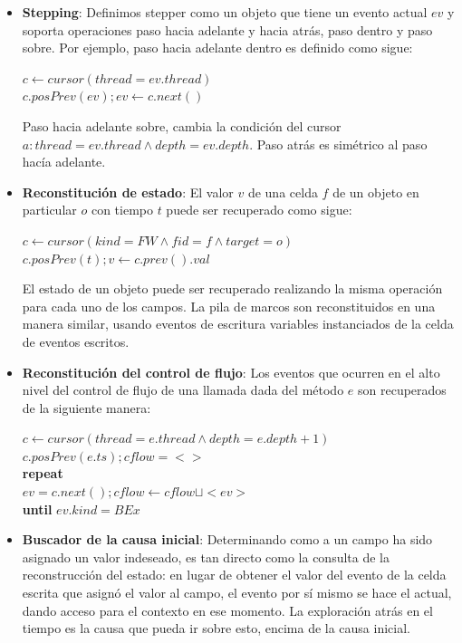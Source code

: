 \documentclass[12pt,legalpaper]{report}
\begin{document}
\begin{itemize}
	\item \textbf{Stepping}: Definimos stepper como un objeto que tiene un evento actual $ev$ y soporta operaciones paso hacia adelante y hacia atrás, paso dentro y paso sobre.  Por ejemplo, paso hacia adelante dentro es definido como sigue:

	$c \leftarrow cursor(thread = ev.thread)$\\
	$c.posPrev(ev); ev \leftarrow c.next()$

Paso hacia adelante sobre, cambia la condición del cursor $a: thread = ev.thread \wedge depth = ev.depth$.  Paso atrás es simétrico al paso hacía adelante.

	\item \textbf{Reconstitución de estado}: El valor $v$ de una celda $f$ de un objeto en particular $o$ con tiempo $t$ puede ser recuperado como sigue:

	$c \leftarrow cursor(kind = FW  \wedge fid = f \wedge target = o)$\\
	$c.posPrev(t); v \leftarrow c.prev().val$

El estado de un objeto puede ser recuperado realizando la misma operación para cada uno de los campos.  La pila de marcos son reconstituidos en una manera similar, usando eventos de escritura variables instanciados de la celda de eventos escritos.

	\item \textbf{Reconstitución del control de flujo}: Los eventos que ocurren en el alto nivel del control de flujo de una llamada dada del método $e$ son recuperados de la siguiente manera:

	$c \leftarrow cursor(thread = e.thread  \wedge depth = e.depth + 1)$\\
	$c.posPrev(e.ts); cflow = <>$\\
	\textbf{repeat}\\
	$ev = c.next(); cflow \leftarrow cflow  \sqcup <ev>$\\
	\textbf{until} $ev.kind = BEx$\\

	\item \textbf{Buscador de la causa inicial}: Determinando como a un campo ha sido asignado un valor indeseado, es tan directo como la consulta de la reconstrucción del estado:  en lugar de obtener el valor del evento de la celda escrita que asignó el valor al campo, el evento por sí mismo se hace el actual, dando acceso para el contexto en ese momento.  La exploración atrás en el tiempo es la causa que pueda ir sobre esto, encima de la causa inicial.
	
\end{itemize}
\end{document}
